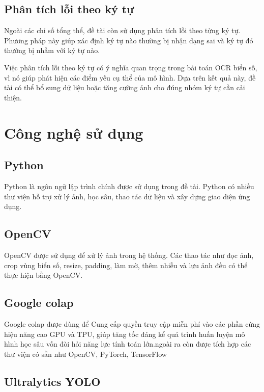 \documentclass[13pt,a4paper]{report}
\begin{document}
\subsection{Phân tích lỗi theo ký tự}

Ngoài các chỉ số tổng thể, đề tài còn sử dụng phân tích lỗi theo từng ký tự. Phương pháp này giúp xác định ký tự nào thường bị nhận dạng sai và ký tự đó thường bị nhầm với ký tự nào.

Việc phân tích lỗi theo ký tự có ý nghĩa quan trọng trong bài toán OCR biển số, vì nó giúp phát hiện các điểm yếu cụ thể của mô hình. Dựa trên kết quả này, đề tài có thể bổ sung dữ liệu hoặc tăng cường ảnh cho đúng nhóm ký tự cần cải thiện.


\section{Công nghệ sử dụng}

\subsection{Python}

Python là ngôn ngữ lập trình chính được sử dụng trong đề tài. Python có nhiều thư viện hỗ trợ xử lý ảnh, học sâu, thao tác dữ liệu và xây dựng giao diện ứng dụng.

\subsection{OpenCV}

OpenCV được sử dụng để xử lý ảnh trong hệ thống. Các thao tác như đọc ảnh, crop vùng biển số, resize, padding, làm mờ, thêm nhiễu và lưu ảnh đều có thể thực hiện bằng OpenCV.

\subsection{Google colap}
Google colap được dùng để Cung cấp quyền truy cập miễn phí vào các phần cứng hiệu năng cao GPU và TPU, giúp tăng tốc đáng kể quá trình huấn luyện mô hình học sâu vốn đòi hỏi năng lực tính toán lớn.ngoài ra còn được tích hợp các thư viện có sẵn như  OpenCV, PyTorch, TensorFlow
\subsection{Ultralytics YOLO}
\end{document}
